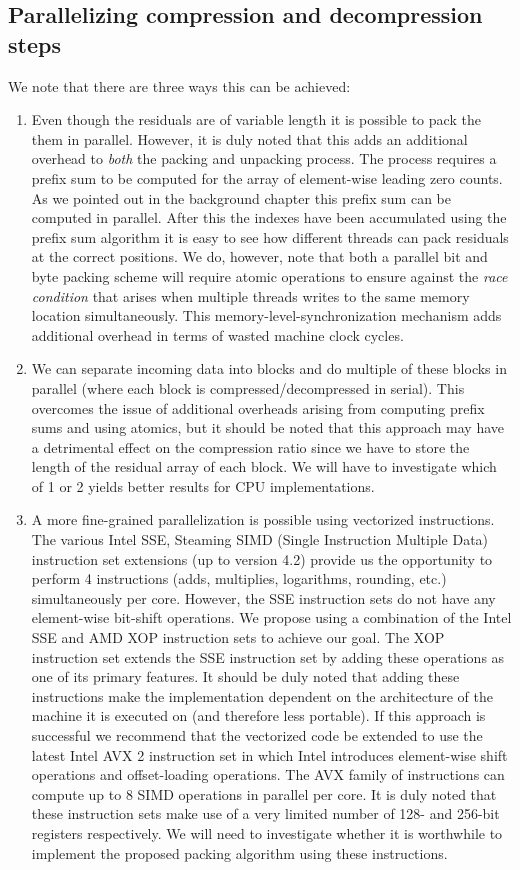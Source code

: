 \documentclass{acm_proc_article-sp}
\begin{document}
\subsection{Parallelizing compression and decompression steps}
We note that there are three ways this can be achieved: 
\begin{enumerate}
 \item Even though the residuals are of variable length it is possible to pack the them in parallel. However, it is duly noted that this adds an additional overhead to \textit{both} the packing and 
 unpacking process. The process requires a prefix sum to be computed for the array of element-wise leading zero counts. As we pointed out in the background chapter this prefix sum can be computed
 in parallel. After this the indexes have been accumulated using the prefix sum algorithm it is easy to see how different threads can pack residuals at the correct positions. We do, however, note that
 both a parallel bit and byte packing scheme will require atomic operations to ensure against the \textit{race condition} that arises when multiple threads writes to the same memory location 
 simultaneously. This memory-level-synchronization mechanism adds additional overhead in terms of wasted machine clock cycles.
 \item We can separate incoming data into blocks and do multiple of these blocks in parallel (where each block is compressed/decompressed in serial). This overcomes the issue of additional overheads arising
 from computing prefix sums and using atomics, but it should be noted that this approach may have a detrimental effect on the compression ratio since we have to store the length of the residual array of each block.
 We will have to investigate which of 1 or 2 yields better results for CPU implementations.
 \item A more fine-grained parallelization is possible using vectorized instructions. The various Intel SSE, Steaming SIMD (Single Instruction Multiple Data) instruction set extensions (up to version 4.2) provide
 us the opportunity to perform 4 instructions (adds, multiplies, logarithms, rounding, etc.) simultaneously per core. However, the SSE instruction sets do not have any element-wise bit-shift operations. We propose 
 using a combination of the Intel SSE and AMD XOP instruction sets to achieve our goal. The XOP instruction set extends the SSE instruction set by adding these operations as one of its primary features. It should
 be duly noted that adding these instructions make the implementation dependent on the architecture of the machine it is executed on (and therefore less portable). If this approach is successful we recommend 
 that the vectorized code be extended to use the latest Intel AVX 2 instruction set in which Intel introduces element-wise shift operations and offset-loading operations. The AVX family of instructions
 can compute up to 8 SIMD operations in parallel per core. It is duly noted that these instruction sets make use of a very limited number of 128- and 256-bit registers respectively. We will need to investigate
 whether it is worthwhile to implement the proposed packing algorithm using these instructions.
\end{enumerate}
\end{document}
